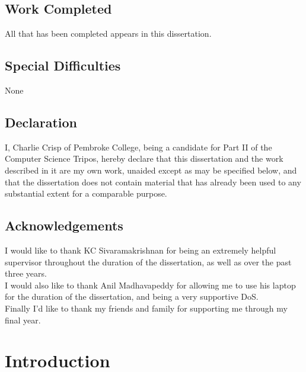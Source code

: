 \documentclass[12pt,a4paper,twoside,openright]{report}
\begin{document}
	
	\section*{Work Completed}
	
	All that has been completed appears in this dissertation.
	
	\section*{Special Difficulties}
	
	None
	 
	\newpage
	\section*{Declaration}
	
	I, Charlie Crisp of Pembroke College, being a candidate for Part II of the Computer
	Science Tripos, hereby declare that this dissertation and the work described in it are my own work,
	unaided except as may be specified below, and that the dissertation
	does not contain material that has already been used to any substantial
	extent for a comparable purpose.
	
	\bigskip
	
	\medskip
	
	\tableofcontents
	
	\listoffigures
	
	\newpage
	\section*{Acknowledgements}
	
	I would like to thank KC Sivaramakrishnan for being an extremely helpful supervisor throughout the duration of the dissertation, as well as over the past three years.\\
	I would also like to thank Anil Madhavapeddy for allowing me to use his laptop for the duration of the dissertation, and being a very supportive DoS.\\
	Finally I'd like to thank my friends and family for supporting me through my final year.
	
	
	\pagestyle{headings}
	
	\chapter{Introduction}
	
\end{document}
